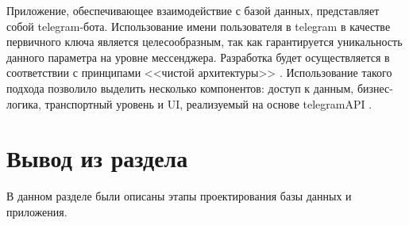 Приложение, обеспечивающее взаимодействие с базой данных, представляет собой telegram-бота. Использование имени пользователя в telegram в качестве первичного ключа является целесообразным, так как гарантируется уникальность данного параметра на уровне мессенджера. Разработка будет осуществляется в соответствии с принципами <<чистой архитектуры>> \cite{clear_code}. Использование такого подхода позволило выделить несколько компонентов: доступ к данным, бизнес-логика, транспортный уровень и  UI, реализуемый на основе telegramAPI \cite{telegram_api}. 

\section{Вывод из раздела}

В данном разделе были описаны этапы проектирования базы данных и приложения.